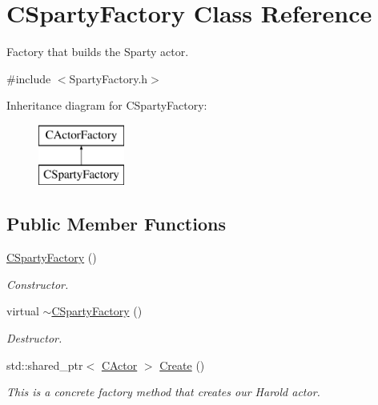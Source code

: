 \hypertarget{class_c_sparty_factory}{\section{C\+Sparty\+Factory Class Reference}
\label{class_c_sparty_factory}
}


Factory that builds the Sparty actor.  




{\ttfamily \#include $<$Sparty\+Factory.\+h$>$}

Inheritance diagram for C\+Sparty\+Factory\+:\begin{figure}[H]
\begin{center}
\leavevmode
\includegraphics[height=2.000000cm]{class_c_sparty_factory}
\end{center}
\end{figure}
\subsection*{Public Member Functions}
\begin{DoxyCompactItemize}
\item 
\hypertarget{class_c_sparty_factory_a18c0a4465dbe6d11366aba4fe4ad9169}{\hyperlink{class_c_sparty_factory_a18c0a4465dbe6d11366aba4fe4ad9169}{C\+Sparty\+Factory} ()}\label{class_c_sparty_factory_a18c0a4465dbe6d11366aba4fe4ad9169}

\begin{DoxyCompactList}\small\item\em Constructor. \end{DoxyCompactList}\item 
\hypertarget{class_c_sparty_factory_a62cd08892f206bf5cb5a632e4e67e022}{virtual \hyperlink{class_c_sparty_factory_a62cd08892f206bf5cb5a632e4e67e022}{$\sim$\+C\+Sparty\+Factory} ()}\label{class_c_sparty_factory_a62cd08892f206bf5cb5a632e4e67e022}

\begin{DoxyCompactList}\small\item\em Destructor. \end{DoxyCompactList}\item 
std\+::shared\+\_\+ptr$<$ \hyperlink{class_c_actor}{C\+Actor} $>$ \hyperlink{class_c_sparty_factory_a171c122e80006b4adcc13a9e81faf3fc}{Create} ()
\begin{DoxyCompactList}\small\item\em This is a concrete factory method that creates our Harold actor. \end{DoxyCompactList}\end{DoxyCompactItemize}
